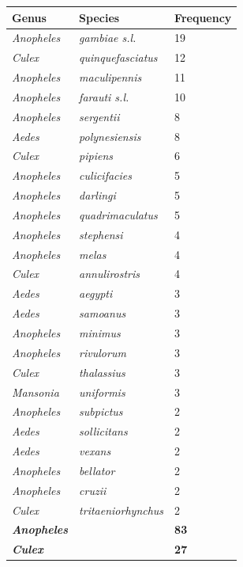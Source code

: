 \documentclass[12pt]{article}
\begin{document}
{\begin{table}[htbp]
	\centering
	\begin{tabular}{lll}
		\toprule
		\textbf{Genus} & \textbf{Species} & \textbf{Frequency} \\
		\midrule
		\textit{Anopheles} & \textit{gambiae s.l.} & 19 \\
		\textit{Culex} & \textit{quinquefasciatus} & 12 \\
		\textit{Anopheles} & \textit{maculipennis} & 11 \\
		\textit{Anopheles} & \textit{farauti s.l.} & 10 \\
		\textit{Anopheles} & \textit{sergentii} & 8 \\
		\textit{Aedes} & \textit{polynesiensis} & 8 \\
		\textit{Culex} & \textit{pipiens} & 6 \\
		\textit{Anopheles} & \textit{culicifacies} & 5 \\
		\textit{Anopheles} & \textit{darlingi} & 5 \\
		\textit{Anopheles} & \textit{quadrimaculatus} & 5 \\
		\textit{Anopheles} & \textit{stephensi} & 4 \\
		\textit{Anopheles} & \textit{melas} & 4 \\
		\textit{Culex} & \textit{annulirostris} & 4 \\
		\textit{Aedes} & \textit{aegypti} & 3 \\
		\textit{Aedes} & \textit{samoanus} & 3 \\
		\textit{Anopheles} & \textit{minimus} & 3 \\
		\textit{Anopheles} & \textit{rivulorum} & 3 \\
		\textit{Culex} & \textit{thalassius} & 3 \\
		\textit{Mansonia} & \textit{uniformis} & 3 \\
		\textit{Anopheles} & \textit{subpictus} & 2 \\
		\textit{Aedes} & \textit{sollicitans} & 2 \\
		\textit{Aedes} & \textit{vexans} & 2 \\
		\textit{Anopheles} & \textit{bellator} & 2 \\
		\textit{Anopheles} & \textit{cruzii} & 2 \\
		\textit{Culex} & \textit{tritaeniorhynchus} & 2 \\
		\bottomrule
		\textit{\textbf{Anopheles}} &       & \textbf{83} \\
		\textit{\textbf{Culex}} &       & \textbf{27} \\

\end{tabular}
\end{table}}
\end{document}
